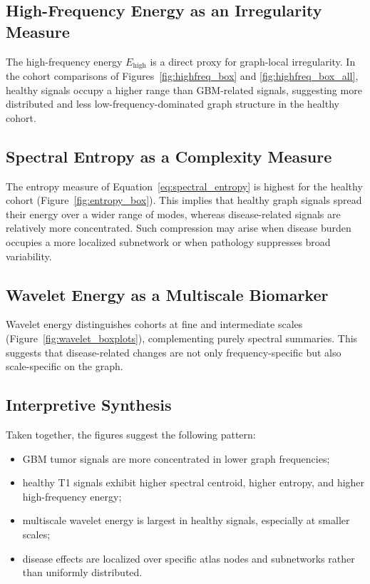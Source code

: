 \subsection{High-Frequency Energy as an Irregularity Measure}

The high-frequency energy \(E_{\mathrm{high}}\) is a direct proxy for graph-local irregularity. In the cohort comparisons of Figures~\ref{fig:highfreq_box} and \ref{fig:highfreq_box_all}, healthy signals occupy a higher range than GBM-related signals, suggesting more distributed and less low-frequency-dominated graph structure in the healthy cohort. %

\subsection{Spectral Entropy as a Complexity Measure}

The entropy measure of Equation~\eqref{eq:spectral_entropy} is highest for the healthy cohort (Figure~\ref{fig:entropy_box}). This implies that healthy graph signals spread their energy over a wider range of modes, whereas disease-related signals are relatively more concentrated. Such compression may arise when disease burden occupies a more localized subnetwork or when pathology suppresses broad variability.

\subsection{Wavelet Energy as a Multiscale Biomarker}

Wavelet energy distinguishes cohorts at fine and intermediate scales (Figure~\ref{fig:wavelet_boxplots}), complementing purely spectral summaries. This suggests that disease-related changes are not only frequency-specific but also scale-specific on the graph.

\subsection{Interpretive Synthesis}

Taken together, the figures suggest the following pattern:
\begin{itemize}
    \item GBM tumor signals are more concentrated in lower graph frequencies;
    \item healthy T1 signals exhibit higher spectral centroid, higher entropy, and higher high-frequency energy;
    \item multiscale wavelet energy is largest in healthy signals, especially at smaller scales;
    \item disease effects are localized over specific atlas nodes and subnetworks rather than uniformly distributed.
\end{itemize}

